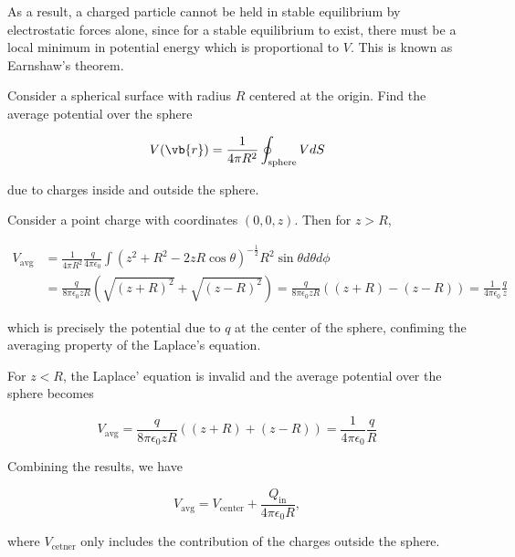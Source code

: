 \documentclass[english,a4paper,12pt]{report}
\begin{document}
As a result, a charged particle cannot be held in stable equilibrium by electrostatic forces alone, since for a stable equilibrium to exist, there must be a local minimum in potential energy which is proportional to \(V\). This is known as Earnshaw's theorem.


{Consider a spherical surface with radius \(R\) centered at the origin. Find the average potential over the sphere

\begin{equation}
    V(\vb{r} ) = \frac{1}{4\pi R^2}\oint_{\text{sphere} } VdS
\end{equation}

due to charges inside and outside the sphere.}
{Consider a point charge with coordinates \((0,0,z)\). Then for \(z>R\),

\begin{equation}
    \begin{aligned}
        V_{\text{avg} } &= \frac{1}{4\pi R^2} \frac{q}{4\pi\epsilon_0} \int (z^2+R^2-2zR\cos \theta )^{-\frac{1}{2}} R^2\sin \theta d\theta d\phi \\ &= \frac{q}{8\pi \epsilon_0zR} (\sqrt{(z+R)^2} + \sqrt{(z-R)^2} ) = \frac{q}{8\pi \epsilon_0zR} ((z+R)-(z-R)) = \frac{1}{4\pi\epsilon_0} \frac{q}{z} 
    \end{aligned}
\end{equation}

which is precisely the potential due to \(q\) at the center of the sphere, confiming the averaging property of the Laplace's equation.

For \(z<R\), the Laplace' equation is invalid and the average potential over the sphere becomes 

\begin{equation}
    V_{\text{avg} } =  \frac{q}{8\pi \epsilon_0zR} ((z+R) + (z-R)) = \frac{1}{4\pi\epsilon_0} \frac{q}{R}
\end{equation}

Combining the results, we have

\begin{equation}
    V_{\text{avg} } = V_{\text{center} } + \frac{Q_{\text{in} } }{4\pi \epsilon _0 R},
\end{equation}

where \(V_{\text{cetner} } \) only includes the contribution of the charges outside the sphere. 
} 
\end{document}
